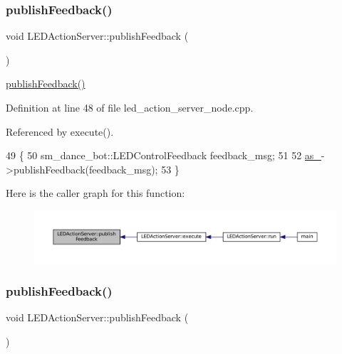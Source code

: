 \subsubsection{\texorpdfstring{publish\+Feedback()}{publishFeedback()}\hspace{0.1cm}{\footnotesize\ttfamily [1/2]}}
{\footnotesize\ttfamily void L\+E\+D\+Action\+Server\+::publish\+Feedback (\begin{DoxyParamCaption}{ }\end{DoxyParamCaption})\hspace{0.3cm}{\ttfamily [inline]}}

\hyperlink{classLEDActionServer_a25c93d4e7ecdacbb4f5b090d7789aa36}{publish\+Feedback()} 

Definition at line 48 of file led\+\_\+action\+\_\+server\+\_\+node.\+cpp.



Referenced by execute().


\begin{DoxyCode}
49 \{
50     sm\_dance\_bot::LEDControlFeedback feedback\_msg;
51     
52     \hyperlink{classLEDActionServer_a61d21c77642081acf017d4ebd65b2de0}{as\_}->publishFeedback(feedback\_msg);
53 \}
\end{DoxyCode}
Here is the caller graph for this function\+:
\nopagebreak
\begin{figure}[H]
\begin{center}
\leavevmode
\includegraphics[width=350pt]{classLEDActionServer_a25c93d4e7ecdacbb4f5b090d7789aa36_icgraph}
\end{center}
\end{figure}
\mbox{\label{classLEDActionServer_a25c93d4e7ecdacbb4f5b090d7789aa36}} 
\subsubsection{\texorpdfstring{publish\+Feedback()}{publishFeedback()}\hspace{0.1cm}{\footnotesize\ttfamily [2/2]}}
{\footnotesize\ttfamily void L\+E\+D\+Action\+Server\+::publish\+Feedback (\begin{DoxyParamCaption}{ }\end{DoxyParamCaption})\hspace{0.3cm}{\ttfamily [inline]}}

